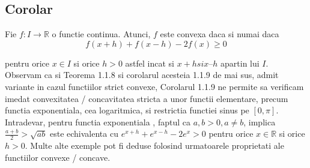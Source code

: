 \documentclass[a4paper,12pt,oneside]{report}
\begin{document}
\subsection{Corolar}

Fie \(f: I \rightarrow \mathbb{R}\) o functie continua. Atunci, \(f\) este convexa daca si numai daca
\begin{displaymath}
  f\left ( x+h \right )+ f\left ( x - h \right ) - 2f\left ( x \right )\geq 0
\end{displaymath}

pentru orice \(x \in I\) si orice \(h > 0\) astfel incat si \(x + h si x – h\) apartin lui \(I\). 
Observam ca si Teorema 1.1.8 si corolarul acesteia 1.1.9 de mai sus, admit variante in cazul functiilor strict convexe, 
Corolarul 1.1.9 ne permite sa verificam imedat convexitatea / concavitatea stricta a unor functii elementare, precum functia exponentiala, cea logaritmica, si restrictia functiei sinus pe \(\left [ 0 , \pi \right ]\). Intradevar, pentru functia exponentiala , faptul ca  \(a , b > 0, a\neq b\), implica \(\frac{a + b}{2}> \sqrt{ab}\)
este echivalenta cu 
\(e^{x + h} + e^{x - h } - 2e^{x}> 0\)
pentru orice \(x\in \mathbb{R}\) si orice \(h > 0\).
	Multe alte exemple pot fi deduse folosind urmatoarele proprietati ale functiilor convexe / concave. 
\end{document}
